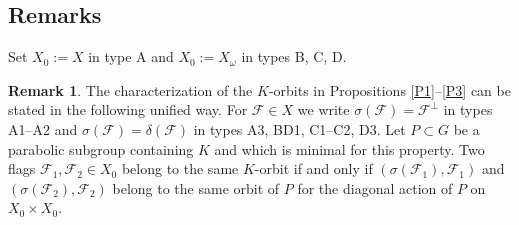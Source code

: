 \documentclass{amsart}
\theoremstyle{definition}
\newtheorem{remark}{Remark}
\begin{document}
\subsection{Remarks}

Set $X_0:=X$ in type A and $X_0:=X_\omega$ in types B, C, D.

\begin{remark}
\label{R3.4.1}
The characterization of the $K$-orbits in Propositions \ref{P1}--\ref{P3} can be stated in the following unified way. For $\mathcal{F}\in X$ we write
$\sigma(\mathcal{F})=\mathcal{F}^\perp$ in types A1--A2 and
$\sigma(\mathcal{F})=\delta(\mathcal{F})$ in types A3, BD1, C1--C2, D3. Let $P\subset
G$ be a parabolic subgroup containing $K$ and which is minimal for
this property. Two flags $\mathcal{F}_1,\mathcal{F}_2\in X_0$ belong
to the same $K$-orbit if and only if
$(\sigma(\mathcal{F}_1),\mathcal{F}_1)$ and
$(\sigma(\mathcal{F}_2),\mathcal{F}_2)$ belong to the same orbit of $P$ for the diagonal action of $P$ on $X_0\times X_0$.
\end{remark}
\end{document}
